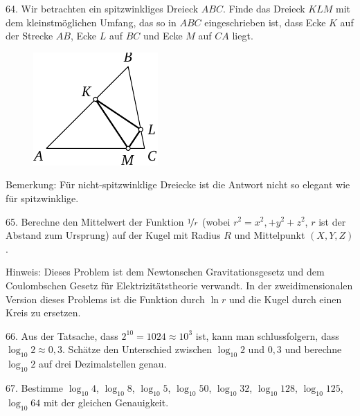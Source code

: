 \begin{problem}{64.}
	Wir betrachten ein spitzwinkliges Dreieck $ABC$. Finde das Dreieck $KLM$ mit dem kleinstmöglichen Umfang, das so in $ABC$ eingeschrieben ist, dass Ecke $K$ auf der Strecke $AB$, Ecke $L$ auf $BC$ und Ecke $M$ auf $CA$ liegt. 
	\begin{figure}
		\includegraphics{taskbook-48} 
	\end{figure}

	\begin{note}{Bemerkung:}
		Für nicht-spitzwinklige Dreiecke ist die Antwort nicht so elegant wie für spitzwinklige.
	\end{note}
\end{problem}

\begin{problem}{65.}
	Berechne den Mittelwert der Funktion $\nicefrac{1}{r}$ (wobei $r^2 =x^2,+y^2+z^2$, $r$ ist der Abstand zum Ursprung)  auf der Kugel mit Radius $R$ und Mittelpunkt $(X,Y,Z)$.

	\begin{note}{Hinweis:}
		Dieses Problem ist dem Newtonschen Gravitationsgesetz und dem Coulombschen Gesetz für Elektrizitätstheorie verwandt. In der zweidimensionalen Version dieses Problems ist die Funktion durch $\ln r$ und die Kugel durch einen Kreis zu ersetzen.
	\end{note}
\end{problem}

\begin{problem}{66.}
	Aus der Tatsache, dass $2^{10}=1024 \approx 10^3$ ist, kann man schlussfolgern, dass $\log_{10} 2 \approx 0,3$. Schätze den Unterschied zwischen $\log_{10} 2$ und $0,3$ und berechne $\log_{10} 2$ auf drei Dezimalstellen genau. 
\end{problem}

\begin{problem}{67.}
	Bestimme $\log_{10} 4$, $\log_{10} 8$, $\log_{10} 5$, $\log_{10} 50$, $\log_{10} 32$, $\log_{10} 128$, $\log_{10} 125$, $\log_{10} 64$ mit der gleichen Genauigkeit.
\end{problem}

